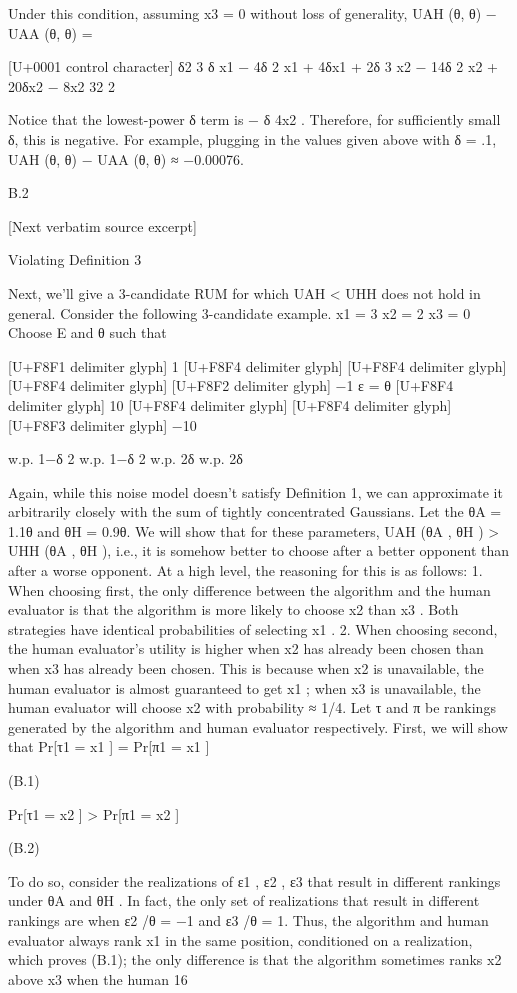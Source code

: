 \documentclass[10pt]{article}
\begin{document}
\begin{ReviewVerbatim}
Under this condition, assuming x3 = 0 without loss of generality,
UAH (θ, θ) − UAA (θ, θ) =

[U+0001 control character]
δ2 3
δ x1 − 4δ 2 x1 + 4δx1 + 2δ 3 x2 − 14δ 2 x2 + 20δx2 − 8x2
32
2

Notice that the lowest-power δ term is − δ 4x2 . Therefore, for sufficiently small δ, this is negative. For
example, plugging in the values given above with δ = .1, UAH (θ, θ) − UAA (θ, θ) ≈ −0.00076.

B.2

[Next verbatim source excerpt]

Violating Definition 3

Next, we’ll give a 3-candidate RUM for which UAH < UHH does not hold in general. Consider the following
3-candidate example.
x1 = 3
x2 = 2
x3 = 0
Choose E and θ such that

[U+F8F1 delimiter glyph]
1
[U+F8F4 delimiter glyph]
[U+F8F4 delimiter glyph]
[U+F8F4 delimiter glyph]
[U+F8F2 delimiter glyph]
−1
ε
=
θ [U+F8F4 delimiter glyph]
10
[U+F8F4 delimiter glyph]
[U+F8F4 delimiter glyph]
[U+F8F3 delimiter glyph]
−10

w.p. 1−δ
2
w.p. 1−δ
2
w.p. 2δ
w.p. 2δ

Again, while this noise model doesn’t satisfy Definition 1, we can approximate it arbitrarily closely with the
sum of tightly concentrated Gaussians. Let the θA = 1.1θ and θH = 0.9θ.
We will show that for these parameters, UAH (θA , θH ) > UHH (θA , θH ), i.e., it is somehow better to choose
after a better opponent than after a worse opponent. At a high level, the reasoning for this is as follows:
1. When choosing first, the only difference between the algorithm and the human evaluator is that the
algorithm is more likely to choose x2 than x3 . Both strategies have identical probabilities of selecting
x1 .
2. When choosing second, the human evaluator’s utility is higher when x2 has already been chosen than
when x3 has already been chosen. This is because when x2 is unavailable, the human evaluator
is almost guaranteed to get x1 ; when x3 is unavailable, the human evaluator will choose x2 with
probability ≈ 1/4.
Let τ and π be rankings generated by the algorithm and human evaluator respectively. First, we will
show that
Pr[τ1 = x1 ] = Pr[π1 = x1 ]

(B.1)

Pr[τ1 = x2 ] > Pr[π1 = x2 ]

(B.2)

To do so, consider the realizations of ε1 , ε2 , ε3 that result in different rankings under θA and θH . In fact,
the only set of realizations that result in different rankings are when ε2 /θ = −1 and ε3 /θ = 1. Thus,
the algorithm and human evaluator always rank x1 in the same position, conditioned on a realization,
which proves (B.1); the only difference is that the algorithm sometimes ranks x2 above x3 when the human
16



\end{ReviewVerbatim}
\end{document}
